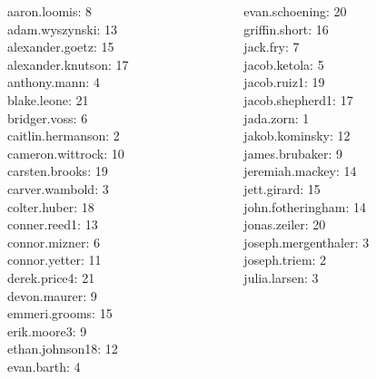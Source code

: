 \documentclass[10pt]{beamer}
\begin{document}
\begin{frame}
\footnotesize 
\vfill 
\begin{columns}
\begin{column}{0.33\textwidth}
aaron.loomis: 8 \\ 
adam.wyszynski: 13 \\ 
alexander.goetz: 15 \\ 
alexander.knutson: 17 \\ 
anthony.mann: 4 \\ 
blake.leone: 21 \\ 
bridger.voss: 6 \\ 
caitlin.hermanson: 2 \\ 
cameron.wittrock: 10 \\ 
carsten.brooks: 19 \\ 
carver.wambold: 3 \\ 
colter.huber: 18 \\ 
conner.reed1: 13 \\ 
connor.mizner: 6 \\ 
connor.yetter: 11 \\ 
derek.price4: 21 \\ 
devon.maurer: 9 \\ 
emmeri.grooms: 15 \\ 
erik.moore3: 9 \\ 
ethan.johnson18: 12 \\ 
evan.barth: 4 \\\end{column}
\begin{column}{0.33\textwidth}
evan.schoening: 20 \\ 
griffin.short: 16 \\ 
jack.fry: 7 \\ 
jacob.ketola: 5 \\ 
jacob.ruiz1: 19 \\ 
jacob.shepherd1: 17 \\ 
jada.zorn: 1 \\ 
jakob.kominsky: 12 \\ 
james.brubaker: 9 \\ 
jeremiah.mackey: 14 \\ 
jett.girard: 15 \\ 
john.fotheringham: 14 \\ 
jonas.zeiler: 20 \\ 
joseph.mergenthaler: 3 \\ 
joseph.triem: 2 \\ 
julia.larsen: 3 \\ 

\end{column}
\end{columns}
\end{frame}
\end{document}
